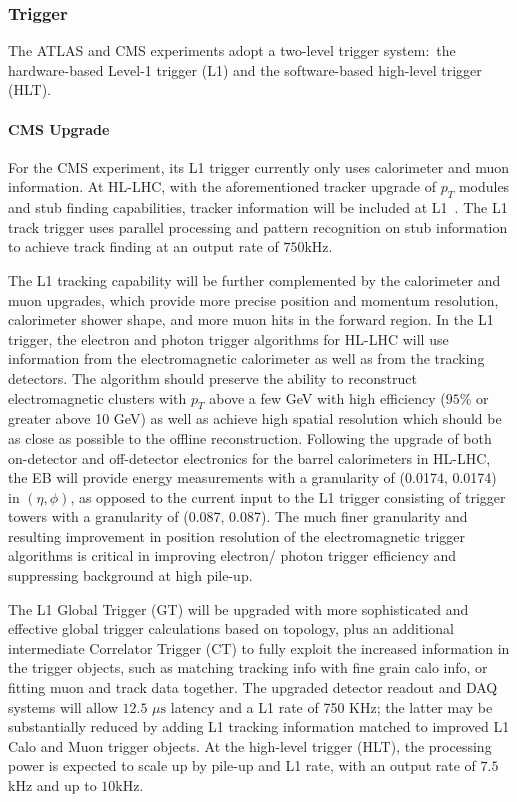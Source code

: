 \subsubsection{Trigger} \label{sec:upgradetrigger}

The ATLAS and CMS experiments adopt a two-level trigger system:~the hardware-based Level-1 trigger (L1) and the software-based high-level trigger (HLT). 

\paragraph{CMS Upgrade} 
For the CMS experiment, its L1 trigger currently only uses calorimeter and muon information. 
At HL-LHC, with the aforementioned tracker upgrade of $p_T$ modules and stub finding capabilities, tracker information will be included at L1~\cite{Lourenco:2283192}. 
The L1 track trigger uses parallel processing and pattern recognition on stub information to achieve track finding at an output rate of $750$kHz. 

The L1 tracking capability will be further complemented by the calorimeter and muon upgrades, which provide more precise position and momentum resolution, calorimeter shower shape, and more muon hits in the forward region.
In the L1 trigger, the electron and photon trigger algorithms for HL-LHC will use information from the electromagnetic calorimeter as well as from the tracking detectors.
The algorithm should preserve the ability to reconstruct electromagnetic clusters with $p_T$ above a few GeV with high efficiency ($95\%$ or
greater above 10 GeV) as well as achieve high spatial resolution which should be as close as possible to the offline reconstruction.
Following the upgrade of both on-detector and off-detector electronics for the barrel calorimeters
in HL-LHC, the EB will provide energy measurements with a granularity of (0.0174, 0.0174)
in $(\eta, \phi)$, as opposed to the current input to the L1 trigger consisting of trigger towers
with a granularity of (0.087, 0.087). The much finer granularity and resulting improvement in position resolution of the electromagnetic trigger algorithms is critical in improving electron/
photon trigger efficiency and suppressing background at high pile-up.

The L1 Global Trigger (GT) will be upgraded with more sophisticated and effective global trigger calculations based on topology,
plus an additional intermediate Correlator Trigger (CT) to fully exploit the increased information in the trigger objects, such as matching tracking info with fine grain calo info, or fitting muon and track data together.
The upgraded detector readout and DAQ systems will allow $12.5\,\, \mu \mathrm{s}$ latency and a L1 rate of 750 KHz; the latter may be substantially reduced by adding L1 tracking information matched to improved L1 Calo and Muon trigger objects.
At the high-level trigger (HLT), the processing power is expected to scale up by pile-up and L1 rate, with an output rate of $7.5$kHz and up to $10$kHz. 

